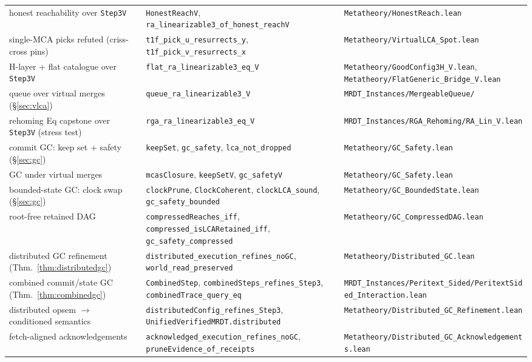 \documentclass[11pt]{article}
\newcommand{\lean}[1]{\texttt{#1}}
\begin{document}
\begin{center}
{\begin{tabular}{@{}lll@{}}
honest reachability over \lean{Step3V} & \lean{HonestReachV}, \lean{ra\_linearizable3\_of\_honest\_reachV} & \lean{Metatheory/HonestReach.lean} \\
single-MCA picks refuted (criss-cross pins) & \lean{t1f\_pick\_u\_resurrects\_y}, \lean{t1f\_pick\_v\_resurrects\_x} & \lean{Metatheory/VirtualLCA\_Spot.lean} \\
H-layer + flat catalogue over \lean{Step3V} & \lean{flat\_ra\_linearizable3\_eq\_V} & \lean{Metatheory/GoodConfig3H\_V.lean}, \lean{Metatheory/FlatGeneric\_Bridge\_V.lean} \\
queue over virtual merges (\S\ref{sec:vlca}) & \lean{queue\_ra\_linearizable3\_V} & \lean{MRDT\_Instances/MergeableQueue/} \\
rehoming Eq capstone over \lean{Step3V} (stress test) & \lean{rga\_ra\_linearizable3\_eq\_V} & \lean{MRDT\_Instances/RGA\_Rehoming/RA\_Lin\_V.lean} \\
commit GC: keep set + safety (\S\ref{sec:gc}) & \lean{keepSet}, \lean{gc\_safety}, \lean{lca\_not\_dropped} & \lean{Metatheory/GC\_Safety.lean} \\
GC under virtual merges & \lean{mcasClosure}, \lean{keepSetV}, \lean{gc\_safetyV} & \lean{Metatheory/GC\_Safety.lean} \\
bounded-state GC: clock swap (\S\ref{sec:gc}) & \lean{clockPrune}, \lean{ClockCoherent}, \lean{clockLCA\_sound}, \lean{gc\_safety\_bounded} & \lean{Metatheory/GC\_BoundedState.lean} \\
root-free retained DAG & \lean{compressedReaches\_iff}, \lean{compressed\_isLCARetained\_iff}, \lean{gc\_safety\_compressed} & \lean{Metatheory/GC\_CompressedDAG.lean} \\
distributed GC refinement (Thm.~\ref{thm:distributedgc}) & \lean{distributed\_execution\_refines\_noGC}, \lean{world\_read\_preserved} & \lean{Metatheory/Distributed\_GC.lean} \\
combined commit/state GC (Thm.~\ref{thm:combinedgc}) & \lean{CombinedStep}, \lean{combinedSteps\_refines\_Step3}, \lean{combinedTrace\_query\_eq} & \lean{MRDT\_Instances/Peritext\_Sided/PeritextSided\_Interaction.lean} \\
distributed opsem $\to$ conditioned semantics & \lean{distributedConfig\_refines\_Step3}, \lean{UnifiedVerifiedMRDT.distributed} & \lean{Metatheory/Distributed\_GC\_Refinement.lean} \\
fetch-aligned acknowledgements & \lean{acknowledged\_execution\_refines\_noGC}, \lean{pruneEvidence\_of\_receipts} & \lean{Metatheory/Distributed\_GC\_Acknowledgements.lean} \\

\end{tabular}}
\end{center}
\end{document}
